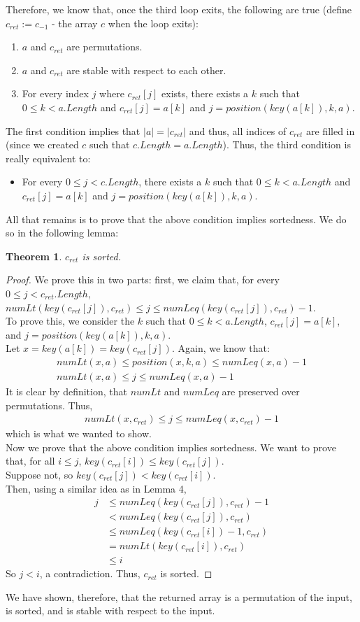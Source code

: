 \documentclass{article}
\newtheorem{theorem}{Theorem}
\begin{document}
Therefore, we know that, once the third loop exits, the following are true (define $c_{ret} := c_{-1}$ - the array $c$ when the loop exits):
\begin{enumerate}
\item
$a$ and $c_{ret}$ are permutations.
\item
$a$ and $c_{ret}$ are stable with respect to each other.
\item
For every index $j$ where $c_{ret}[j]$ exists, there exists a $k$ such that $0 \leq k < a.Length$ and $c_{ret}[j] = a[k]$ and $j = position(key(a[k]), k, a)$.
\end{enumerate}
The first condition implies that $|a| = |c_{ret}|$ and thus, all indices of $c_{ret}$ are filled in (since we created $c$ such that $c.Length = a.Length$). Thus, the third condition is really equivalent to:
\begin{itemize}
\item
For every $0 \leq j < c.Length$, there exists a $k$ such that $0 \leq k < a.Length$ and $c_{ret}[j] = a[k]$ and $j = position(key(a[k]), k, a)$.
\end{itemize}
All that remains is to prove that the above condition implies sortedness. We do so in the following lemma:
\begin{theorem}
$c_{ret}$ is sorted.
\end{theorem}
\begin{proof}
We prove this in two parts: first, we claim that, for every $0 \leq j < c_{ret}.Length$, \\$numLt(key(c_{ret}[j]), c_{ret})\leq j \leq numLeq(key(c_{ret}[j]), c_{ret}) - 1$.
\\To prove this, we consider the $k$ such that $0 \leq k < a.Length$, $c_{ret}[j] = a[k]$, and $j = position(key(a[k]), k, a)$.
\\Let $x = key(a[k]) = key(c_{ret}[j])$. Again, we know that:
\begin{align*}
numLt(x, a) \leq position(x, k, a) \leq numLeq(x, a) - 1 \\
numLt(x, a) \leq j \leq numLeq(x, a) - 1
\end{align*}
It is clear by definition, that $numLt$ and $numLeq$ are preserved over permutations. Thus,
\begin{align*}
numLt(x, c_{ret}) \leq j \leq numLeq(x, c_{ret}) - 1
\end{align*}
which is what we wanted to show.
\\Now we prove that the above condition implies sortedness. We want to prove that, for all $i \leq j$, $key(c_{ret}[i]) \leq key(c_{ret}[j])$.
\\Suppose not, so $key(c_{ret}[j]) < key(c_{ret}[i])$.
\\Then, using a similar idea as in Lemma 4, 
\begin{align*}
j &\leq numLeq(key(c_{ret}[j]), c_{ret}) - 1 \\
&< numLeq(key(c_{ret}[j]), c_{ret}) \\
&\leq numLeq(key(c_{ret}[i]) - 1, c_{ret}) \\
&= numLt(key(c_{ret}[i]), c_{ret}) \\
&\leq i
\end{align*}
So $j < i$, a contradiction. Thus, $c_{ret}$ is sorted.
\end{proof}
We have shown, therefore, that the returned array is a permutation of the input, is sorted, and is stable with respect to the input.
\end{document}
